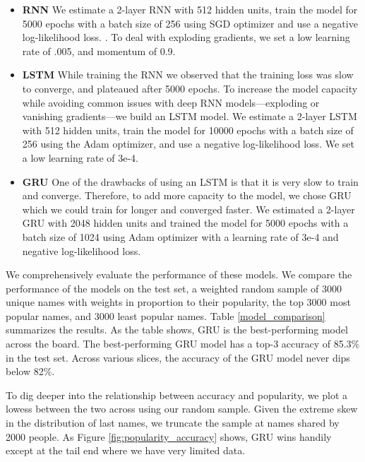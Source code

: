 \documentclass[11pt,  letterpaper]{article}
\begin{document}
\begin{itemize}

    \item \textbf{RNN} We estimate a 2-layer RNN with 512 hidden units, train the model for 5000 epochs with a batch size of 256 using SGD optimizer and use a negative log-likelihood loss. \citep{10.1145/3426826.3426842, 8469258}. To deal with exploding gradients, we set a low learning rate of .005, and momentum of 0.9. 

    \item \textbf{LSTM} While training the RNN we observed that the training loss was slow to converge, and plateaued after 5000 epochs. To increase the model capacity while avoiding common issues with deep RNN models---exploding or vanishing gradients---we build an LSTM model. We estimate a 2-layer LSTM with 512 hidden units, train the model for 10000 epochs with a batch size of 256 using the Adam optimizer, and use a negative log-likelihood loss. We set a low learning rate of 3e-4. 

    \item \textbf{GRU} One of the drawbacks of using an LSTM is that it is very slow to train and converge. Therefore, to add more capacity to the model, we chose GRU which we could train for longer and converged faster. We estimated a 2-layer GRU with 2048 hidden units and trained the model for 5000 epochs with a batch size of 1024 using Adam optimizer with a learning rate of 3e-4 and negative log-likelihood loss. 

\end{itemize}

We comprehensively evaluate the performance of these models. We compare the performance of the models on the test set, a weighted random sample of 3000 unique names with weights in proportion to their popularity, the top 3000 most popular names, and 3000 least popular names. Table \ref{model_comparison} summarizes the results. As the table shows, GRU is the best-performing model across the board. The best-performing GRU model has a top-3 accuracy of 85.3\% in the test set. Across various slices, the accuracy of the GRU model never dips below 82\%. 



To dig deeper into the relationship between accuracy and popularity, we plot a lowess between the two across using our random sample. Given the extreme skew in the distribution of last names, we truncate the sample at names shared by 2000 people. As Figure \ref{fig:popularity_accuracy} shows, GRU wins handily except at the tail end where we have very limited data. 
\end{document}
